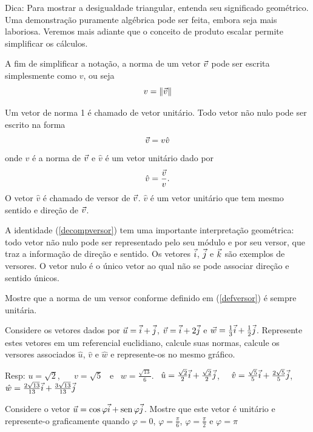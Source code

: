 Dica: Para mostrar a desigualdade triangular, entenda seu significado geométrico. Uma demonstração puramente algébrica pode ser feita, embora seja mais laboriosa. Veremos mais adiante que o conceito de produto escalar permite simplificar os cálculos. 

A fim de simplificar a notação, a norma de um vetor $\vec{v}$ pode ser escrita simplesmente como $v$, ou seja
$$v=\|\vec{v}\|$$ 

Um vetor de norma 1 é chamado de vetor unitário. Todo vetor não nulo pode ser escrito na forma
\begin{equation}\label{decompversor}\vec{v}=v \hat{v}\end{equation}
onde $v$ é a norma de $\vec{v}$ e $\hat{v}$ é um vetor unitário dado por
\begin{equation}\label{defversor}\hat{v}=\frac{\vec{v}}{v}.\end{equation}
O vetor $\hat{v}$ é chamado de versor de $\vec{v}$. $\hat{v}$ é um vetor unitário que tem mesmo sentido e direção de $\vec{v}$.

A identidade (\ref{decompversor}) tem uma importante interpretação geométrica: todo vetor não nulo pode ser representado pelo seu módulo e por seu versor, que traz a informação de direção e sentido.  Os vetores $\vec{i}$, $\vec{j}$ e $\vec{k}$ são exemplos de versores. O vetor nulo é o único vetor ao qual não se pode associar direção e sentido únicos.


\begin{prob}Mostre que a norma de um versor conforme definido em (\ref{defversor}) é sempre unitária. 
\end{prob}

\begin{prob}\label{ex1uvw} Considere os vetores dados por $\vec{u}=\vec{i}+\vec{j}$, $\vec{v}=\vec{i}+2\vec{j}$ e $\vec{w}=\frac{1}{3}\vec{i}+\frac{1}{2}\vec{j}$. Represente estes vetores em um referencial euclidiano, calcule suas normas, calcule os versores associados $\hat{u}$, $\hat{v}$ e $\hat{w}$ e represente-os no mesmo gráfico.  
\end{prob}
Resp: $u=\sqrt{2}$, ~~ $v=\sqrt{5}$ ~e~ $w=\frac{\sqrt{13}}{{6}}$.~ $\hat{u}=\frac{\sqrt{2}}{2}\vec{i}+\frac{\sqrt{2}}{2}\vec{j}$,~~  $\hat{v}=\frac{\sqrt{5}}{5}\vec{i}+\frac{2\sqrt{5}}{5}\vec{j}$,~~ $\hat{w}=\frac{2\sqrt{13}}{13}\vec{i}+\frac{3\sqrt{13}}{13}\vec{j}$

\begin{prob} Considere o vetor $\vec{u}=\cos\varphi \vec{i}+ \operatorname{sen}\varphi \vec{j}$. Mostre que este vetor é unitário e represente-o graficamente quando $\varphi=0$, $\varphi=\frac{\pi}{6}$, $\varphi=\frac{\pi}{2}$ e $\varphi={\pi}$ 
\end{prob}

